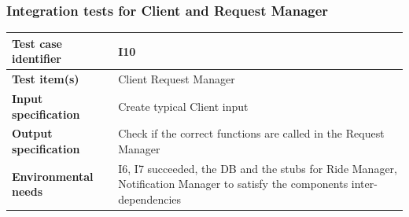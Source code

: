 \documentclass[a4paper,11pt]{report} %
\begin{document}
		\subsubsection{Integration tests for Client and Request Manager} \label{sec:3.1.7}
			\begin{minipage}{\linewidth}
			\end{minipage}		
		\begin{center}
			\renewcommand{\arraystretch}{1.2}
			\setlength{\tabcolsep}{24pt}
			\begin{tabular}{ l  p{9cm}}\hline
				\textbf{Test case identifier} & I10\\\hline
				\textbf{Test item(s)} & Client \textrightarrow Request Manager\\\hline
				\textbf{Input specification} & Create typical Client input \\\hline
				\textbf{Output specification} & Check if the correct functions are called in the Request Manager\\\hline
				\textbf{Environmental needs} &  I6, I7 succeeded, the DB and the stubs for Ride Manager, Notification Manager to satisfy the components inter-dependencies\\\hline
			\end{tabular}
		\end{center}
		
		\pagebreak		
\end{document}
